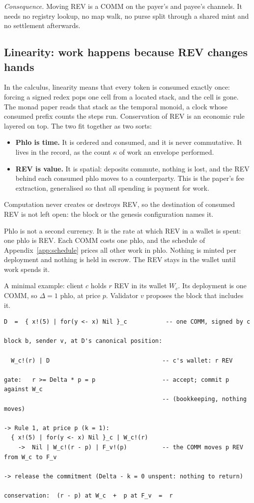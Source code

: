 \documentclass[11pt]{article}
\newcommand{\code}{\path}
\begin{document}
\emph{Consequence.} Moving REV is a COMM on the payer's and payee's channels. It needs no registry lookup, no map walk, no purse split through a shared mint and no settlement afterwards.

\subsection{Linearity: work happens because REV changes hands}\label{sec:linear}

In the calculus, linearity means that every token is consumed exactly once: forcing a signed redex pops one cell from a located stack, and the cell is gone. The monad paper reads that stack as the temporal monoid, a clock whose consumed prefix counts the steps run. Conservation of REV is an economic rule layered on top. The two fit together as two sorts:
\begin{itemize}
\item \textbf{Phlo is time.} It is ordered and consumed, and it is never commutative. It lives in the record, as the count $\kappa$ of work an envelope performed.
\item \textbf{REV is value.} It is spatial: deposits commute, nothing is lost, and the REV behind each consumed phlo moves to a counterparty. This is the paper's fee extraction, generalised so that all spending is payment for work.
\end{itemize}
Computation never creates or destroys REV, so the destination of consumed REV is not left open: the block or the genesis configuration names it.

Phlo is not a second currency. It is the rate at which REV in a wallet is spent: one phlo is \code{phloPrice} REV. Each COMM costs one phlo, and the schedule of Appendix~\ref{app:schedule} prices all other work in phlo. Nothing is minted per deployment and nothing is held in escrow. The REV stays in the wallet until work spends it.

A minimal example: client $c$ holds $r$ REV in its wallet $W_c$. Its deployment is one COMM, so $\Delta = 1$ phlo, at price $p$. Validator $v$ proposes the block that includes it.

\begin{Verbatim}[fontsize=\footnotesize,frame=single,framesep=6pt]
D  =  { x!(5) | for(y <- x) Nil }_c           -- one COMM, signed by c

block b, sender v, at D's canonical position:

  W_c!(r) | D                                -- c's wallet: r REV

gate:   r >= Delta * p = p                   -- accept; commit p against W_c
                                             -- (bookkeeping, nothing moves)

-> Rule 1, at price p (k = 1):
  { x!(5) | for(y <- x) Nil }_c | W_c!(r)
    ->  Nil | W_c!(r - p) | F_v!(p)          -- the COMM moves p REV from W_c to F_v

-> release the commitment (Delta - k = 0 unspent: nothing to return)

conservation:  (r - p) at W_c  +  p at F_v  =  r
\end{Verbatim}
\end{document}
